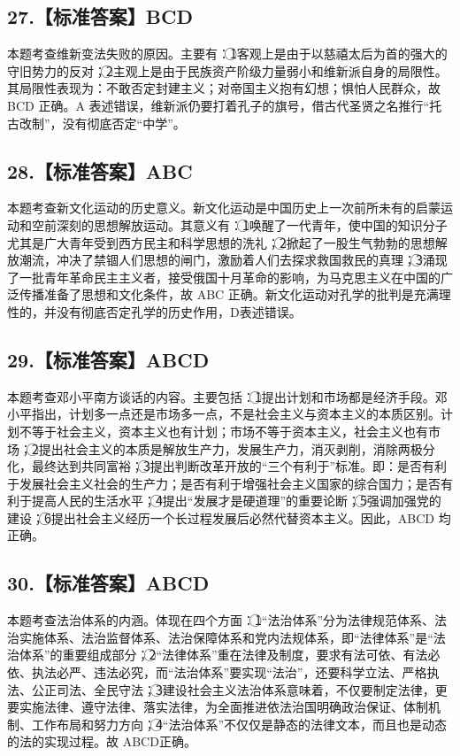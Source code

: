 \documentclass[UTF8,11pt]{ctexart}
\begin{document}
\subsection*{27.【标准答案】BCD}

本题考查维新变法失败的原因。主要有：\textcircled{1}客观上是由于以慈禧太后为首的强大的守旧势力的反对；\textcircled{2}主观上是由于民族资产阶级力量弱小和维新派自身的局限性。其局限性表现为：不敢否定封建主义；对帝国主义抱有幻想；惧怕人民群众，故 BCD 正确。A 表述错误，维新派仍要打着孔子的旗号，借古代圣贤之名推行“托古改制”，没有彻底否定“中学”。


\subsection*{28.【标准答案】ABC}

本题考查新文化运动的历史意义。新文化运动是中国历史上一次前所未有的启蒙运动和空前深刻的思想解放运动。其意义有：\textcircled{1}唤醒了一代青年，使中国的知识分子尤其是广大青年受到西方民主和科学思想的洗礼；\textcircled{2}掀起了一股生气勃勃的思想解放潮流，冲决了禁锢人们思想的闸门，激励着人们去探求救国救民的真理；\textcircled{3}涌现了一批青年革命民主主义者，接受俄国十月革命的影响，为马克思主义在中国的广泛传播准备了思想和文化条件，故 ABC 正确。新文化运动对孔学的批判是充满理性的，并没有彻底否定孔学的历史作用，D表述错误。


\subsection*{29.【标准答案】ABCD}

本题考查邓小平南方谈话的内容。主要包括：\textcircled{1}提出计划和市场都是经济手段。邓小平指出，计划多一点还是市场多一点，不是社会主义与资本主义的本质区别。计划不等于社会主义，资本主义也有计划；市场不等于资本主义，社会主义也有市场；\textcircled{2}提出社会主义的本质是解放生产力，发展生产力，消灭剥削，消除两极分化，最终达到共同富裕；\textcircled{3}提出判断改革开放的“三个有利于”标准。即：是否有利于发展社会主义社会的生产力；是否有利于增强社会主义国家的综合国力；是否有利于提高人民的生活水平；\textcircled{4}提出“发展才是硬道理”的重要论断；\textcircled{5}强调加强党的建设；\textcircled{6}提出社会主义经历一个长过程发展后必然代替资本主义。因此，ABCD 均正确。


\subsection*{30.【标准答案】ABCD}

本题考查法治体系的内涵。体现在四个方面：\textcircled{1}“法治体系”分为法律规范体系、法治实施体系、法治监督体系、法治保障体系和党内法规体系，即“法律体系”是“法治体系”的重要组成部分；\textcircled{2}“法律体系”重在法律及制度，要求有法可依、有法必依、执法必严、违法必究，而“法治体系”要实现“法治”，还要科学立法、严格执法、公正司法、全民守法；\textcircled{3}建设社会主义法治体系意味着，不仅要制定法律，更要实施法律、遵守法律、落实法律，为全面推进依法治国明确政治保证、体制机制、工作布局和努力方向；\textcircled{4}“法治体系”不仅仅是静态的法律文本，而且也是动态的法的实现过程。故 ABCD正确。
\end{document}
